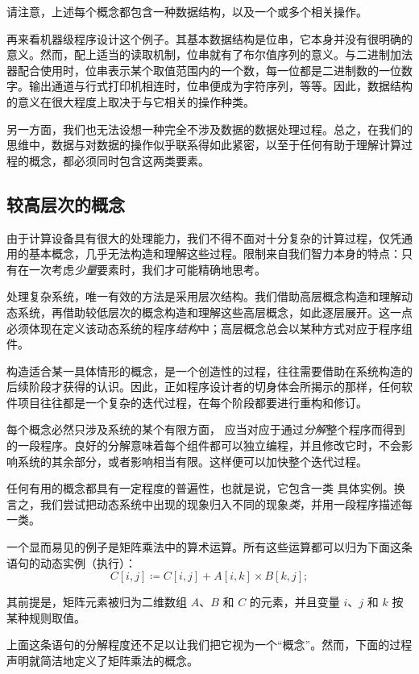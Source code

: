 请注意，上述每个概念都包含一种数据结构，以及一个或多个相关操作。

再来看机器级程序设计这个例子。其基本数据结构是位串，它本身并没有很明确的意义。然而，配上适当的读取机制，位串就有了布尔值序列的意义。与二进制加法器配合使用时，位串表示某个取值范围内的一个数，每一位都是二进制数的一位数字。输出通道与行式打印机相连时，位串便成为字符序列，等等。因此，数据结构的意义在很大程度上取决于与它相关的操作种类。

另一方面，我们也无法设想一种完全不涉及数据的数据处理过程。总之，在我们的思维中，数据与对数据的操作似乎联系得如此紧密，以至于任何有助于理解计算过程的概念，都必须同时包含这两类要素。

\subsection{较高层次的概念}

由于计算设备具有很大的处理能力，我们不得不面对十分复杂的计算过程，仅凭通用的基本概念，几乎无法构造和理解这些过程。限制来自我们智力本身的特点：只有在一次考虑\textit{少量}要素时，我们才可能精确地思考。

处理复杂系统，唯一有效的方法是采用层次结构。我们借助高层概念构造和理解动态系统，再借助较低层次的概念构造和理解这些高层概念，如此逐层展开。这一点必须体现在定义该动态系统的程序\textit{结构}中；高层概念总会以某种方式对应于程序组件。

构造适合某一具体情形的概念，是一个创造性的过程，往往需要借助在系统构造的后续阶段才获得的认识。因此，正如程序设计者的切身体会所揭示的那样，任何软件项目往往都是一个复杂的迭代过程，在每个阶段都要进行重构和修订。

每个概念必然只涉及系统的某个有限方面，
应当对应于通过\textit{分解}整个程序而得到的一段程序。良好的分解意味着每个组件都可以独立编程，并且修改它时，不会影响系统的其余部分，或者影响相当有限。这样便可以加快整个迭代过程。

任何有用的概念都具有一定程度的普遍性，也就是说，它包含一类
具体实例。换言之，我们尝试把动态系统中出现的现象归入不同的现象\textit{类}，并用一段程序描述每一类。

一个显而易见的例子是矩阵乘法中的算术运算。所有这些运算都可以归为下面这条语句的动态实例（执行）：
$$
C[i, j] \coloneq C[i,j] + A[i, k] \times B[k, j];
$$

\noindent
其前提是，矩阵元素被归为二维数组 $A$、$B$ 和 $C$ 的元素，并且变量 $i$、$j$ 和 $k$ 按某种规则取值。

上面这条语句的分解程度还不足以让我们把它视为一个“概念”。然而，下面的过程声明就简洁地定义了矩阵乘法的概念。

